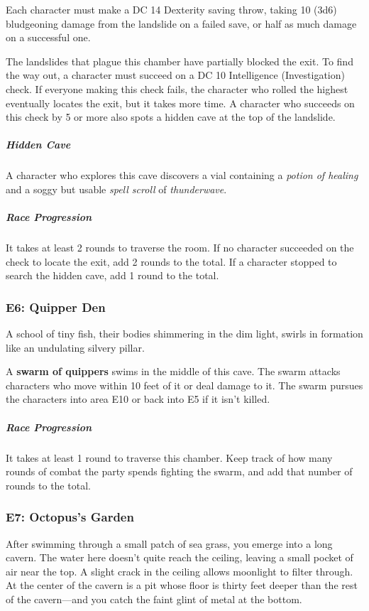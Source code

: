 \documentclass[10pt,a4paper,twoside,bg=print,twocolumn,openany,nodeprecatedcode]{dndbook}
\begin{document}
Each character must make a DC 14 Dexterity saving throw, taking 10 (3d6) bludgeoning damage from the landslide on a failed save, or half as much damage on a successful one.

The landslides that plague this chamber have partially blocked the exit. To find the way out, a character must succeed on a DC 10 Intelligence (Investigation) check. If everyone making this check fails, the character who rolled the highest eventually locates the exit, but it takes more time. A character who succeeds on this check by 5 or more also spots a hidden cave at the top of the landslide.

\subparagraph{Hidden Cave}
A character who explores this cave discovers a vial containing a \textit{potion of healing} and a soggy but usable \textit{spell scroll} of \textit{thunderwave}.

\subparagraph{Race Progression}
It takes at least 2 rounds to traverse the room. If no character succeeded on the check to locate the exit, add 2 rounds to the total. If a character stopped to search the hidden cave, add 1 round to the total.

\subsubsection{E6: Quipper Den}
\begin{DndReadAloud}{}
A school of tiny fish, their bodies shimmering in the dim light, swirls in formation like an undulating silvery pillar.

\end{DndReadAloud}

A \textbf{swarm of quippers} swims in the middle of this cave. The swarm attacks characters who move within 10 feet of it or deal damage to it. The swarm pursues the characters into area E10 or back into E5 if it isn't killed.

\subparagraph{Race Progression}
It takes at least 1 round to traverse this chamber. Keep track of how many rounds of combat the party spends fighting the swarm, and add that number of rounds to the total.

\subsubsection{E7: Octopus's Garden}
\begin{DndReadAloud}{}
After swimming through a small patch of sea grass, you emerge into a long cavern. The water here doesn't quite reach the ceiling, leaving a small pocket of air near the top. A slight crack in the ceiling allows moonlight to filter through. At the center of the cavern is a pit whose floor is thirty feet deeper than the rest of the cavern—and you catch the faint glint of metal at the bottom.

\end{DndReadAloud}
\end{document}
